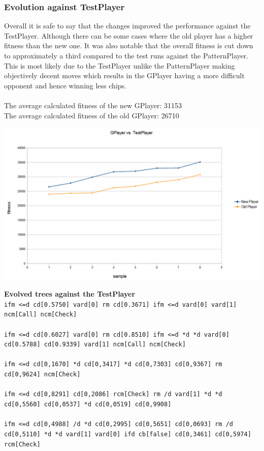 \documentclass[12pt,fleqn,a4paper]{article}
\begin{document}
\subsubsection{Evolution against TestPlayer}
Overall it is safe to say that the changes improved the performance against the TestPlayer. Although there can be some cases where the old player has a higher fitness than the new one. It was also notable that the overall fitness is cut down to approximately a third compared to the test runs against the PatternPlayer. This is most likely due to the TestPlayer unlike the PatternPlayer making objectively decent moves which results in the GPlayer having a more difficult opponent and hence winning less chips.\\ \\
The average calculated fitness of the new GPlayer: 31153\\
The average calculated fitness of the old GPlayer: 26710

\begin{center}
	\includegraphics[width=.9\textwidth]{gp_vs_tp_1.png}
\end{center}

\textbf{Evolved trees against the TestPlayer}\\
\texttt{ifm <=d cd[0.5750] vard[0] rm cd[0.3671] ifm <=d vard[0] vard[1] ncm[Call] ncm[Check]} \\ \\
\texttt{ifm <=d cd[0.6027] vard[0] rm cd[0.8510] ifm <=d *d *d vard[0] cd[0.5788] cd[0.9339] vard[1] ncm[Call] ncm[Check]}\\ \\
\texttt{ifm <=d cd[0,1670] *d cd[0,3417] *d cd[0,7303] cd[0,9367] rm cd[0,9624] ncm[Check]}\\ \\
\texttt{ifm <=d cd[0,8291] cd[0,2086] rcm[Check] rm /d vard[1] *d *d cd[0,5560] cd[0,0537] *d cd[0,0519] cd[0,9908]}\\ \\
\texttt{ifm <=d cd[0,4988] /d *d cd[0,2995] cd[0,5651] cd[0,0693] rm /d cd[0,5110] *d *d vard[1] vard[0] ifd cb[false] cd[0,3461] cd[0,5974] rcm[Check]}
\end{document}
